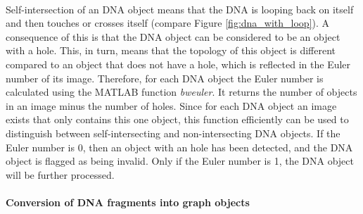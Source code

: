 \documentclass{article}
\begin{document}
\\Self-intersection of an DNA object means that the DNA is looping back on itself and then touches or crosses itself (compare Figure \ref{fig:dna_with_loop}). A consequence of this is that the DNA object can be considered to be an object with a hole. This, in turn, means that the topology of this object is different compared to an object that does not have a hole, which is reflected in the Euler number of its image. Therefore, for each DNA object the Euler number is calculated using the MATLAB function \textit{bweuler}. It returns the number of objects in an image minus the number of holes. Since for each DNA object an image exists that only contains this one object, this function efficiently can be used to distinguish between self-intersecting and non-intersecting DNA objects. If the Euler number is 0, then an object with an hole has been detected, and the DNA object is flagged as being invalid. Only if the Euler number is 1, the DNA object will be further processed.\\

\paragraph{Conversion of DNA fragments into graph objects}
\end{document}
